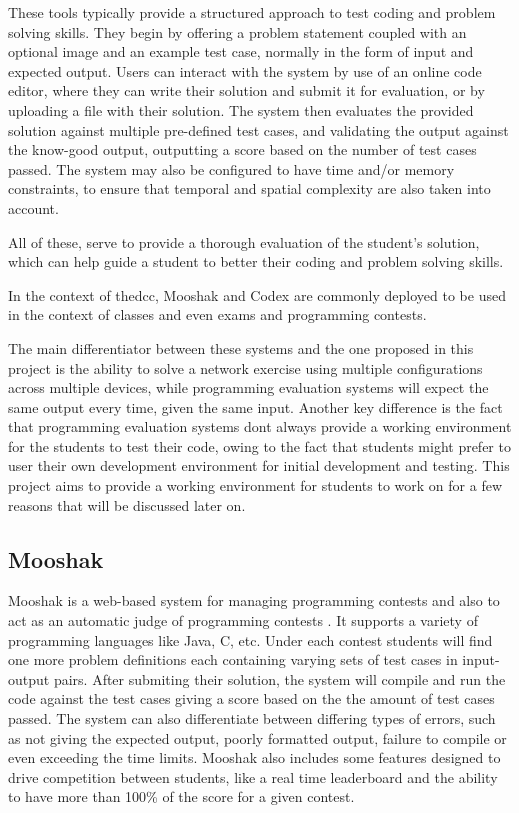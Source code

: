 These tools typically provide a structured approach to test coding and problem solving skills. They begin by offering a
problem statement coupled with an optional image and an example test case, normally in the form of input and expected output.
Users can interact with the system by use of an online code editor, where they can write their solution and submit it for
evaluation, or by uploading a file with their solution. The system then evaluates the provided solution against multiple
pre-defined test cases, and validating the output against the know-good output, outputting a score based on the number of 
test cases passed. The system may also be configured to have time and/or memory constraints, to ensure that temporal and
spatial complexity are also taken into account.

All of these, serve to provide a thorough evaluation of the student's solution, which can help guide a student to better
their coding and problem solving skills.

In the context of the\ac{dcc}, Mooshak and Codex are commonly deployed to be used in the context of classes and 
even exams and programming contests.

The main differentiator between these systems and the one proposed in this project is the ability to solve a network 
exercise using multiple configurations across multiple devices, while programming evaluation systems will expect
the same output every time, given the same input.
Another key difference is the fact that programming evaluation systems dont always provide a working environment for the 
students to test their code, owing to the fact that students might prefer to user their own development environment for 
initial development and testing. This project aims to provide a working environment for students to work on for a few
reasons that will be discussed later on. 

\subsection{Mooshak}
Mooshak is a web-based system for managing programming contests and also to act as an automatic judge of programming 
contests \cite{Leal2003567}. It supports a variety of programming languages like Java, C, etc. Under each contest students will find one more 
problem definitions each containing varying sets of test cases in input-output pairs. After submiting their solution, 
the system will compile and run the code against the test cases giving a score based on the the amount of test cases passed.
The system can also differentiate between differing types of errors, such as not giving the expected output, poorly 
formatted output, failure to compile or even exceeding the time limits.
Mooshak also includes some features designed to drive competition between students, like a real time leaderboard and
the ability to have more than 100\% of the score for a given contest.

